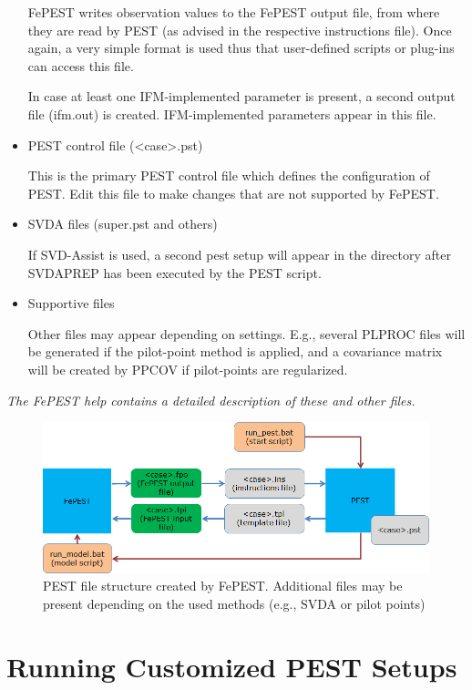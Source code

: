 \begin{itemize}
FePEST writes observation values to the FePEST output file, from where they are read by PEST (as advised in the respective instructions file). Once again, a very simple format is used thus that user-defined scripts or plug-ins can access this file.

In case at least one IFM-implemented parameter is present, a second output file (ifm.out) is created. IFM-implemented parameters appear in this file.

\item PEST control file (\textless  case\textgreater.pst)
 
This is the primary PEST control file which defines the configuration of PEST. Edit this file to make changes that are not supported by FePEST.

\item SVDA files (super.pst and others)

If SVD-Assist is used, a second pest setup will appear in the directory after SVDAPREP has been executed by the PEST script.  

\item Supportive files

Other files may appear depending on settings. E.g., several PLPROC files will be generated if the pilot-point method is applied, and a covariance matrix will be created by PPCOV if pilot-points are regularized.

\end{itemize}

\textit{The FePEST help contains a detailed description of these and other files.}

\begin{figure}
	\center
	\includegraphics[width=2\columnwidth]{figures/FileStructure.png}
\caption{PEST file structure created by FePEST. Additional files may be present depending on the used methods (e.g., SVDA or pilot points)}
\label{fig:fepest:FileStructure}
\end{figure}

\section{Running Customized PEST Setups}

